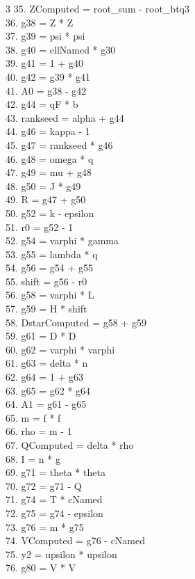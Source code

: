 \documentclass[10pt]{article}
\begin{document}
\begin{multicols}{3}
35. ZComputed = root\_sum - root\_btq3\\
36. g38 = Z * Z\\
37. g39 = psi * psi\\
38. g40 = ellNamed * g30\\
39. g41 = 1 + g40\\
40. g42 = g39 * g41\\
41. A0 = g38 - g42\\
42. g44 = qF * b\\
43. rankseed = alpha + g44\\
44. g46 = kappa - 1\\
45. g47 = rankseed * g46\\
46. g48 = omega * q\\
47. g49 = mu + g48\\
48. g50 = J * g49\\
49. R = g47 + g50\\
50. g52 = k - epsilon\\
51. r0 = g52 - 1\\
52. g54 = varphi * gamma\\
53. g55 = lambda * q\\
54. g56 = g54 + g55\\
55. shift = g56 - r0\\
56. g58 = varphi * L\\
57. g59 = H * shift\\
58. DstarComputed = g58 + g59\\
59. g61 = D * D\\
60. g62 = varphi * varphi\\
61. g63 = delta * n\\
62. g64 = 1 + g63\\
63. g65 = g62 * g64\\
64. A1 = g61 - g65\\
65. m = f * f\\
66. rho = m - 1\\
67. QComputed = delta * rho\\
68. I = n * g\\
69. g71 = theta * theta\\
70. g72 = g71 - Q\\
71. g74 = T * cNamed\\
72. g75 = g74 - epsilon\\
73. g76 = m * g75\\
74. VComputed = g76 - cNamed\\
75. y2 = upsilon * upsilon\\
76. g80 = V * V\\

\end{multicols}
\end{document}
